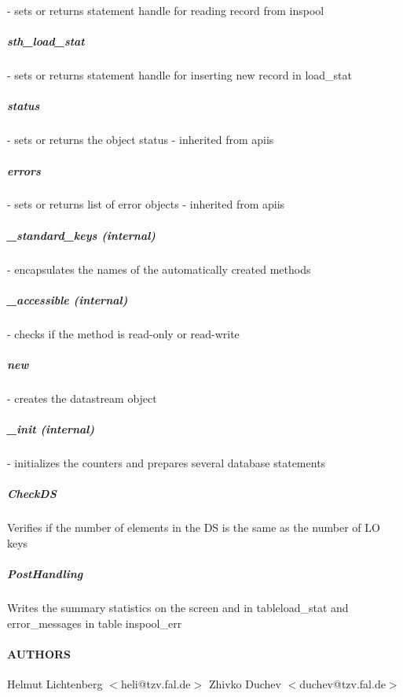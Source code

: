 - sets or returns statement handle for reading record from  inspool

\subparagraph*{sth\_load\_stat\label{DataStream_sth_load_stat}}


- sets or returns statement handle for inserting new record in load\_stat

\subparagraph*{status\label{DataStream_status}}


- sets or returns the object status - inherited from apiis

\subparagraph*{errors\label{DataStream_errors}}


- sets or returns list of error objects - inherited from apiis

\subparagraph*{\_standard\_keys (internal)\label{DataStream__standard_keys_internal_}}


- encapsulates the names of the automatically created methods

\subparagraph*{\_accessible (internal)\label{DataStream__accessible_internal_}}


- checks if the method is read-only or read-write

\subparagraph*{new\label{DataStream_new}}


- creates the datastream object

\subparagraph*{\_init (internal)\label{DataStream__init_internal_}}


- initializes the counters and prepares several database statements

\subparagraph*{CheckDS\label{DataStream_CheckDS}}


Verifies if the number of elements in the DS is the same as the number of LO keys

\subparagraph*{PostHandling\label{DataStream_PostHandling}}


Writes the summary statistics on the screen and in tableload\_stat and  error\_messages in table inspool\_err

\paragraph*{AUTHORS\label{DataStream_AUTHORS}}


Helmut Lichtenberg $<$heli@tzv.fal.de$>$
Zhivko Duchev $<$duchev@tzv.fal.de$>$

